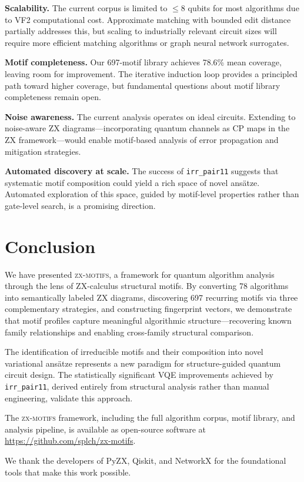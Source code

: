 \documentclass[twocolumn,prl,amsmath,amssymb,superscriptaddress]{revtex4-2}
\newcommand{\zxmotifs}{\textsc{zx-motifs}}
\begin{document}
\textbf{Scalability.}
The current corpus is limited to $\leq$8 qubits for most algorithms due to VF2 computational cost.
Approximate matching with bounded edit distance partially addresses this, but scaling to industrially relevant circuit sizes will require more efficient matching algorithms or graph neural network surrogates.

\textbf{Motif completeness.}
Our 697-motif library achieves 78.6\% mean coverage, leaving room for improvement.
The iterative induction loop provides a principled path toward higher coverage, but fundamental questions about motif library completeness remain open.

\textbf{Noise awareness.}
The current analysis operates on ideal circuits.
Extending to noise-aware ZX diagrams---incorporating quantum channels as CP maps in the ZX framework---would enable motif-based analysis of error propagation and mitigation strategies.

\textbf{Automated discovery at scale.}
The success of \texttt{irr\_pair11} suggests that systematic motif composition could yield a rich space of novel ansätze.
Automated exploration of this space, guided by motif-level properties rather than gate-level search, is a promising direction.

\section{Conclusion}
\label{sec:conclusion}

We have presented \zxmotifs{}, a framework for quantum algorithm analysis through the lens of ZX-calculus structural motifs.
By converting 78 algorithms into semantically labeled ZX diagrams, discovering 697 recurring motifs via three complementary strategies, and constructing fingerprint vectors, we demonstrate that motif profiles capture meaningful algorithmic structure---recovering known family relationships and enabling cross-family structural comparison.

The identification of irreducible motifs and their composition into novel variational ansätze represents a new paradigm for structure-guided quantum circuit design.
The statistically significant VQE improvements achieved by \texttt{irr\_pair11}, derived entirely from structural analysis rather than manual engineering, validate this approach.

The \zxmotifs{} framework, including the full algorithm corpus, motif library, and analysis pipeline, is available as open-source software at \url{https://github.com/splch/zx-motifs}.

\begin{acknowledgments}
We thank the developers of PyZX, Qiskit, and NetworkX for the foundational tools that make this work possible.
\end{acknowledgments}


\end{document}
